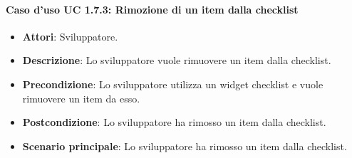 \paragraph{Caso d'uso UC 1.7.3: Rimozione di un item dalla checklist}
\label{UC 1.7.3: Rimozione di un item dalla checklist}

\FloatBarrier
\begin{itemize}
\item\textbf{Attori}: Sviluppatore.
\item\textbf{Descrizione}: Lo sviluppatore vuole rimuovere un item dalla checklist.
\item\textbf{Precondizione}: Lo sviluppatore utilizza un widget checklist e vuole rimuovere un item da esso.
\item\textbf{Postcondizione}: Lo sviluppatore ha rimosso un item dalla checklist.
\item\textbf{Scenario principale}: Lo sviluppatore ha rimosso un item dalla checklist.
\end{itemize}